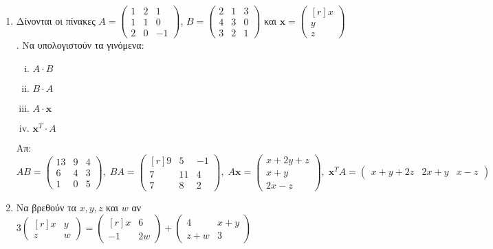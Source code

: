 \documentclass[a4paper,table]{report}
\begin{document}
\begin{enumerate}
  \item Δίνονται οι πίνακες $ A = 
    \begin{pmatrix}
      1 & 2 & 1 \\
      1 & 1 & 0 \\
      2 & 0 & -1
    \end{pmatrix} $, $ B= 
    \begin{pmatrix}
      2 & 1 & 3 \\
      4 & 3 & 0 \\
      3 & 2 & 1
    \end{pmatrix} $ και $ \mathbf{x} =  
    \begin{pmatrix*}[r] x \\ y \\ z \end{pmatrix*} $. Να υπολογιστούν τα γινόμενα:
    \begin{enumerate}[i)]
      \item $ A\cdot B $
      \item $ B\cdot A $
      \item $A \cdot \mathbf{x} $
      \item $ \mathbf{x}^{T} \cdot A$
    \end{enumerate} 
    \hfill Απ: $ \scriptstyle{AB= 
    \begin{pmatrix}
      13 & 9 & 4 \\
      6 & 4 & 3 \\
      1 & 0 & 5
    \end{pmatrix}, \;  BA = 
    \begin{pmatrix*}[r]
      9 & 5 & -1 \\
      7 & 11 & 4 \\
      7 & 8 & 2
    \end{pmatrix*}, \; A \mathbf{x} = 
    \begin{pmatrix*} x+2y+z \\ x+y \\ 2x-z \end{pmatrix*}, \;  \mathbf{x}^{T}A = 
    \begin{pmatrix*}
      x+y+2z & 2x+y & x-z
  \end{pmatrix*}} $  

\item Να βρεθούν τα $ x,y, z $ και $ w $ αν $ 3 
  \begin{pmatrix*}[r]
    x & y \\
    z &w
  \end{pmatrix*} = 
  \begin{pmatrix*}[r]
    x & 6 \\
    -1 & 2w
  \end{pmatrix*} + 
  \begin{pmatrix*}
    4 & x+y \\
    z+w & 3
  \end{pmatrix*} $ 


\end{enumerate}
\end{document}
